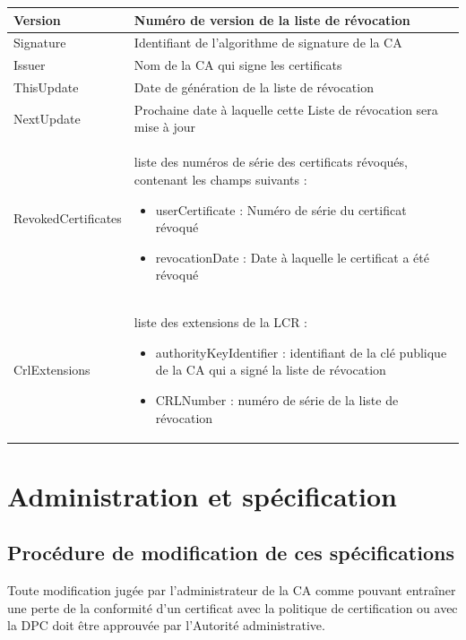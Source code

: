 \documentclass[a4paper,11pt,french]{book}
\begin{document}
\begin{tabular}{|l|p{10cm}|}
\hline
Version  & Numéro de version de la liste de révocation
\\
\hline
Signature  & Identifiant de l'algorithme de signature de la CA

\\
\hline
Issuer  & Nom de la CA qui signe les certificats
 
\\
\hline
ThisUpdate  & Date de génération de la liste de révocation
\\
\hline
NextUpdate  & Prochaine date à laquelle cette Liste de révocation sera mise à jour 

\\
\hline
RevokedCertificates  & liste des numéros de série des certificats révoqués, contenant les champs suivants :
\begin{itemize}
\item userCertificate : Numéro de série du certificat révoqué 
\item revocationDate : Date à laquelle le certificat a été révoqué

\end{itemize}

\\
\hline
CrlExtensions &  liste des extensions de la LCR :
\begin{itemize}
\item authorityKeyIdentifier : identifiant de la clé publique de la CA qui a signé la liste de révocation
\item CRLNumber : numéro de série de la liste de révocation 
\end{itemize}
\\
\hline

\end{tabular}

\section{Administration et spécification}
\subsection{Procédure de modification de ces spécifications}
Toute modification jugée par l’administrateur de la CA comme pouvant entraîner une perte de la conformité d’un certificat avec la politique de certification ou avec la DPC doit être
approuvée par l’Autorité administrative. 
\end{document}
